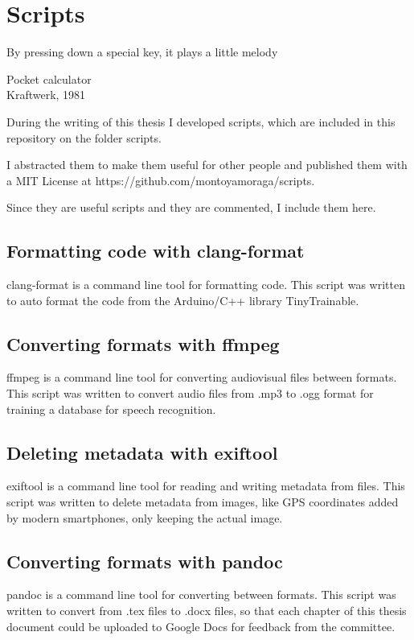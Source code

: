 \chapter{Scripts}

\epigraph{By pressing down a special key, it plays a little melody}{Pocket calculator \\ Kraftwerk, 1981}

During the writing of this thesis I developed scripts, which are included in this repository on the folder scripts.

I abstracted them to make them useful for other people and published them with a MIT License at https://github.com/montoyamoraga/scripts.

Since they are useful scripts and they are commented, I include them here.

\section{Formatting code with clang-format}

clang-format is a command line tool for formatting code. This script was written to auto format the code from the Arduino/C++ library TinyTrainable.



\section{Converting formats with ffmpeg}

ffmpeg is a command line tool for converting audiovisual files between formats. This script was written to convert audio files from .mp3 to .ogg format for training a database for speech recognition.



\section{Deleting metadata with exiftool}

exiftool is a command line tool for reading and writing metadata from files. This script was written to delete metadata from images, like GPS coordinates added by modern smartphones, only keeping the actual image.



\section{Converting formats with pandoc}

pandoc is a command line tool for converting between formats. This script was written to convert from .tex files to .docx files, so that each chapter of this thesis document could be uploaded to Google Docs for feedback from the committee.


